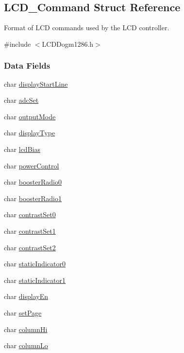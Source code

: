\subsection{L\-C\-D\-\_\-\-Command Struct Reference}
\label{struct_l_c_d___command}


Format of L\-C\-D commands used by the L\-C\-D controller.  




{\ttfamily \#include $<$L\-C\-D\-Dogm1286.\-h$>$}

\subsubsection*{Data Fields}
\begin{DoxyCompactItemize}
\item 
char \hyperlink{struct_l_c_d___command_ae4fbd8142bd9ee7b42020251b036efe6}{display\-Start\-Line}
\item 
char \hyperlink{struct_l_c_d___command_a13174f610535ad591df48139b2e4c511}{adc\-Set}
\item 
char \hyperlink{struct_l_c_d___command_afe9d8a469e345bcbf35cfe14e5184eb4}{output\-Mode}
\item 
char \hyperlink{struct_l_c_d___command_a795b45502f9138dfc6486297cd14628b}{display\-Type}
\item 
char \hyperlink{struct_l_c_d___command_a1ccb63cfbfab6ef7627a1951640ddbd4}{lcd\-Bias}
\item 
char \hyperlink{struct_l_c_d___command_a988a63f9ff8ca32ab6952c097de3e5a7}{power\-Control}
\item 
char \hyperlink{struct_l_c_d___command_a9f62631a5984e53bf96647e1ce68c25c}{booster\-Radio0}
\item 
char \hyperlink{struct_l_c_d___command_a05a53c0a6c81f5db5438695b14c2f9a8}{booster\-Radio1}
\item 
char \hyperlink{struct_l_c_d___command_a37382a7a2ddbd5ccdd3ee1db887bb50d}{contrast\-Set0}
\item 
char \hyperlink{struct_l_c_d___command_aa031605824fe2c5e283c8bcd7f27e9db}{contrast\-Set1}
\item 
char \hyperlink{struct_l_c_d___command_af26bfd125db7aef96ce618bc31181a23}{contrast\-Set2}
\item 
char \hyperlink{struct_l_c_d___command_a5b301143d4a24deb3946fd6a23b46b3e}{static\-Indicator0}
\item 
char \hyperlink{struct_l_c_d___command_af42f170bac9dfd5edfcf2a9f8b940525}{static\-Indicator1}
\item 
char \hyperlink{struct_l_c_d___command_ad5e77eb483dec8e803653904047f2945}{display\-En}
\item 
char \hyperlink{struct_l_c_d___command_a0e0aeb304cfae0c5af8ec43c3c8daa50}{set\-Page}
\item 
char \hyperlink{struct_l_c_d___command_a53634dafcc4b7694da1dbfa351b3986e}{column\-Hi}
\item 
char \hyperlink{struct_l_c_d___command_adaf735a3cc75a92e5b8bbc51d7bf2975}{column\-Lo}
\end{DoxyCompactItemize}


